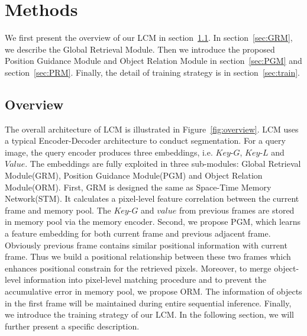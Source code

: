 \documentclass[final]{cvpr}
\begin{document}
\section{Methods}
We first present the overview of our LCM in section~\ref{sec:overview}. In section~\ref{sec:GRM}, we describe the Global Retrieval Module. Then we introduce the proposed Position Guidance Module and Object Relation Module in section~\ref{sec:PGM} and section~\ref{sec:PRM}. Finally, the detail of training strategy is in section~\ref{sec:train}.

\subsection{Overview}\label{sec:overview}
The overall architecture of LCM is illustrated in Figure~\ref{fig:overview}. LCM uses a typical Encoder-Decoder architecture to conduct segmentation. For a query image, the query encoder produces three embeddings, i.e. $Key$-$G$, $Key$-$L$ and $Value$. The embeddings are fully exploited in three sub-modules: Global Retrieval Module(GRM), Position Guidance Module(PGM) and Object Relation Module(ORM). First, GRM is designed the same as Space-Time Memory Network(STM)\cite{STM}. It calculates a pixel-level feature correlation between the current frame and memory pool. 
The $Key$-$G$ and $value$ from previous frames
are stored in memory pool via the memory encoder. Second, we propose PGM, which learns a feature embedding for both current frame and previous adjacent frame. Obviously previous frame contains similar positional information with current frame. Thus we build a positional relationship between these two frames which enhances positional constrain for the retrieved pixels. Moreover, to merge object-level information into pixel-level matching procedure and to prevent the accumulative error in memory pool, we propose ORM. The information of objects in the first frame will be maintained during entire sequential inference. Finally, we introduce the training strategy of our LCM. In the following section, we will further present a specific description. 
\end{document}
